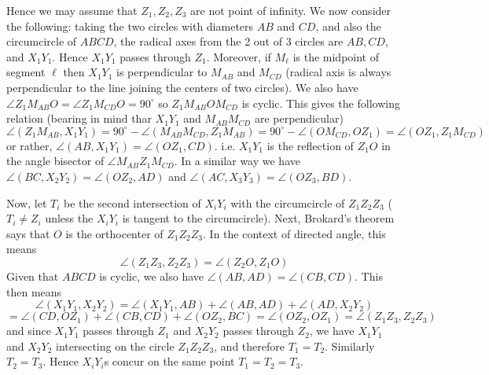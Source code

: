 \documentclass[11pt,a4paper]{article}
\begin{document}
\begin{enumerate}
	Hence we may assume that $Z_1, Z_2, Z_3$ are not point of infinity. We now consider the following: taking the two circles with diameters $AB$ and $CD$, and also the circumcircle of $ABCD$, the radical axes from the 2 out of 3 circles are $AB, CD$, and $X_1Y_1$. Hence $X_1Y_1$ passes through $Z_1$. 
	Moreover, if $M_\ell$ is the midpoint of segment $\ell$ then $X_1Y_1$ is perpendicular to $M_{AB}$ and $M_{CD}$ (radical axis is always perpendicular to the line joining the centers of two circles). 
	We also have $\angle Z_1M_{AB}O=\angle Z_1M_{CD}O=90^{\circ}$ so $Z_1M_{AB}OM_{CD}$ is cyclic. This gives the following relation (bearing in mind thar $X_1Y_1$ and $M_{AB}M_{CD}$ are perpendicular)
	\[
	\angle(Z_1M_{AB}, X_1Y_1)=90^{\circ} - \angle(M_{AB}M_{CD}, Z_1M_{AB})
	=90^{\circ} - \angle(OM_{CD}, OZ_1) = \angle(OZ_1, Z_1M_{CD})
	\]
	or rather, $\angle(AB, X_1Y_1)=\angle(OZ_1, CD)$. 
	i.e. $X_1Y_1$ is the reflection of $Z_1O$ in the angle bisector of $\angle M_{AB}Z_1M_{CD}$. 
	In a similar way we have $\angle(BC, X_2Y_2)=\angle(OZ_2, AD)$ and $\angle(AC, X_3Y_3)=\angle(OZ_3, BD)$. 
	
	Now, let $T_i$ be the second intersection of $X_iY_i$ with the circumcircle of $Z_1Z_2Z_3$ ($T_i\neq Z_i$ unless the $X_iY_i$ is tangent to the circumcircle). 
	Next, Brokard's theorem says that $O$ is the orthocenter of $Z_1Z_2Z_3$. In the context of directed angle, this means 
	\[
	\angle(Z_1Z_3, Z_2Z_3)=\angle(Z_2O, Z_1O)
	\]
	Given that $ABCD$ is cyclic, we also have $\angle(AB, AD)=\angle(CB, CD)$. This then means 
	\[
	\angle(X_1Y_1, X_2Y_2)=\angle(X_1Y_1, AB)+\angle(AB, AD)+\angle(AD, X_2Y_2)
	\]\[
	=\angle(CD, OZ_1)+\angle(CB, CD)+\angle(OZ_2, BC)
	=\angle(OZ_2, OZ_1)=\angle(Z_1Z_3, Z_2Z_3)
	\]
	and since $X_1Y_1$ passes through $Z_1$ and $X_2Y_2$ passes through $Z_2$, we have $X_1Y_1$ and $X_2Y_2$ intersecting on the circle $Z_1Z_2Z_3$, and therefore $T_1=T_2$. Similarly $T_2=T_3$. Hence $X_iY_i$s concur on the same point $T_1=T_2=T_3$. 
	
\end{enumerate}
\end{document}
